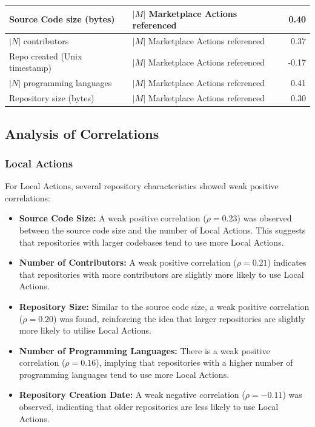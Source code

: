 \documentclass[conference]{IEEEtran}
\begin{document}
\begin{table}[h]
\begin{tabular}{|l|l|r|}
              \hline
              Source Code size (bytes) & $|M|$ Marketplace Actions referenced & 0.40 \\
              \hline
              $|N|$ contributors & $|M|$ Marketplace Actions referenced & 0.37 \\
              \hline
              Repo created (Unix timestamp) & $|M|$ Marketplace Actions referenced & -0.17 \\
              \hline
              $|N|$ programming languages & $|M|$ Marketplace Actions referenced & 0.41 \\
              \hline
              Repository size (bytes) & $|M|$ Marketplace Actions referenced & 0.30 \\
              \hline
          \end{tabular}
      \end{table}
      
      \subsection{Analysis of Correlations}
      
      \subsubsection{Local Actions}
      For Local Actions, several repository characteristics showed weak positive correlations:
      
      \begin{itemize}
          \item \textbf{Source Code Size:} A weak positive correlation (\(\rho = 0.23\)) was observed between the source code size and the number of Local Actions. This suggests that repositories with larger codebases tend to use more Local Actions.
          \item \textbf{Number of Contributors:} A weak positive correlation (\(\rho = 0.21\)) indicates that repositories with more contributors are slightly more likely to use Local Actions.
          \item \textbf{Repository Size:} Similar to the source code size, a weak positive correlation (\(\rho = 0.20\)) was found, reinforcing the idea that larger repositories are slightly more likely to utilise Local Actions.
          \item \textbf{Number of Programming Languages:} There is a weak positive correlation (\(\rho = 0.16\)), implying that repositories with a higher number of programming languages tend to use more Local Actions.
          \item \textbf{Repository Creation Date:} A weak negative correlation (\(\rho = -0.11\)) was observed, indicating that older repositories are less likely to use Local Actions.
      \end{itemize}
      
\end{document}
